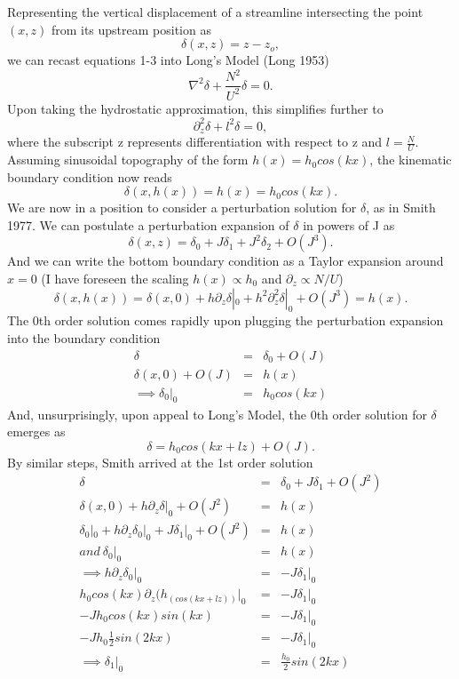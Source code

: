 \documentclass[12pt]{article}
\begin{document}
Representing the vertical displacement of a streamline intersecting the point $(x,z)$ from its upstream position as 
\[
\delta(x,z) = z-z_o,
\]
we can recast equations 1-3 into Long's Model (Long 1953)
\[
\nabla^2\delta + \frac{N^2}{U^2}\delta = 0.
\]
Upon taking the hydrostatic approximation, this simplifies further to
\[
\partial_z^2\delta + l^2\delta = 0,
\]
where the subscript z represents differentiation with respect to z and $l=\frac{N}{U}$.
Assuming sinusoidal topography of the form $h(x) = h_0 cos(kx)$, the kinematic boundary condition now reads
\[
\delta(x,h(x)) = h(x) = h_0 cos(kx).
\]
We are now in a position to consider a perturbation solution for $\delta$, as in Smith 1977. We can postulate a perturbation expansion of $\delta$ in powers of J as
\[
\delta(x,z) = \delta_0+ J\delta _1 +  J^2 \delta_2+ O(J^3).
\]
And we can write the bottom boundary condition as a Taylor expansion around $x=0$ (I have foreseen the scaling $h(x)\propto h_0$ and $\partial_z \propto N/U$)
\[
\delta(x,h(x)) = \delta(x,0) + h \partial_z \delta |_0 +  h^2 \partial_z^2 \delta |_0 + O(J^3) = h(x).
\]
The 0th order solution comes rapidly upon plugging the perturbation expansion into the boundary condition
\begin{eqnarray*}
	\delta &=& \delta_0 + O(J) \\
	\delta(x,0) + O(J) &=& h(x)\\
	\implies \delta_0|_0 &=& h_0cos(kx)
\end{eqnarray*}
And, unsurprisingly, upon appeal to Long's Model, the 0th order solution for $\delta$ emerges as
\[
\delta = h_0cos(kx+lz)  + O(J).
\]
By similar steps, Smith arrived at the 1st order solution
\begin{eqnarray*}
	\delta &=& \delta_0 + J\delta_1 + O(J^2) \\
	\delta(x,0) + h \partial_z \delta |_0 +  O(J^2) &=& h(x)\\
	\delta_0|_0 +  h \partial_z \delta_0 |_0 + J\delta_1|_0 +O(J^2)&=& h(x)\\
	and \   \delta_0|_0 &=& h(x) \\
	\implies h \partial_z \delta_0 |_0 &=& -J\delta_1|_0\\
	h_0 cos(kx) \partial_z(h_(cos(kx+lz))|_0&=& -J\delta_1|_0\\
	 -J h_0 cos(kx)sin(kx) &=& -J\delta_1|_0\\
	  -J h_0 \frac{1}{2}sin(2kx) &=& -J\delta_1|_0\\
	\implies \delta_1|_0 &=& \frac{h_0}{2}sin(2kx)
\end{eqnarray*}
\end{document}
